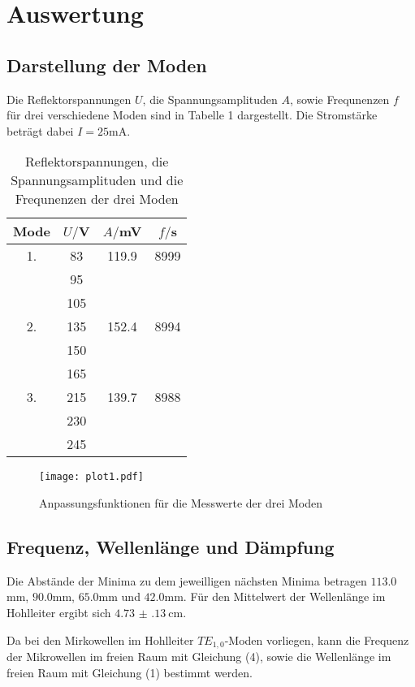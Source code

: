 \section{Auswertung}
\label{sec:Auswertung}

\subsection{Darstellung der Moden}
Die Reflektorspannungen $U$, die Spannungsamplituden $A$, sowie Frequnenzen $f$ für drei verschiedene Moden sind in Tabelle 1 dargestellt.
Die Stromstärke beträgt dabei $I = 25$mA.



\begin{table}[H]
  \centering
  \caption{Reflektorspannungen, die Spannungsamplituden und die Frequnenzen der drei Moden}
  \label{tab:Parameter}
  \begin{tabular}{c c c c}
    \toprule
    Mode & $U/$V & $A/$mV& $f/$s\\
    \midrule
    1. & 83  &   119.9& 8999 \\
       & 95  & &       \\
       & 105 & &       \\
    2. & 135 &    152.4 & 8994 \\
       & 150 & & \\
       & 165 & & \\
    3. & 215 &  139.7  & 8988 \\
       & 230 & & \\
       & 245 & & \\
    \bottomrule
  \end{tabular}
\end{table}

\begin{figure}
  \centering
  \texttt{[image: plot1.pdf]}
  \caption{Anpassungsfunktionen für die Messwerte der drei Moden}
  \label{fig:plot}
\end{figure}



\subsection{Frequenz, Wellenlänge und Dämpfung}
Die Abstände der Minima zu dem jeweilligen nächsten Minima betragen $113.0$mm, $90.0$mm,
$65.0$mm und $42.0$mm.
Für den Mittelwert der Wellenlänge im Hohlleiter ergibt sich $\SI{4.73(13)}{\centi\meter}$.

Da bei den Mirkowellen im Hohlleiter $TE_{1,0}$-Moden vorliegen, kann die Frequenz der
Mikrowellen im freien Raum mit Gleichung (4), sowie die Wellenlänge im freien Raum mit Gleichung (1)
bestimmt werden.

